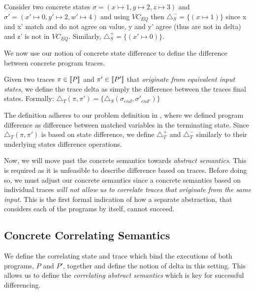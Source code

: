 \begin{Example}
Consider two concrete states $\sigma = (x \mapsto 1,y \mapsto 2,z \mapsto 3)$ and $\sigma' = (x' \mapsto 0,y' \mapsto 2,w' \mapsto 4)$ and using $VC_{EQ}$ then $\triangle_{S}^{-} = \{ (x \mapsto 1) \}$ since x and x' match and do not agree on value, y and y' agree (thus are not in delta) and z' is not in $VC_{EQ}$. Similarly, $\triangle_{S}^{+} = \{ (x' \mapsto 0) \}$.
\end{Example}

We now use our notion of concrete state difference to define the difference between concrete program traces.

\begin{definition}
Given two traces $\pi \in \lbrack\!\lbrack P \rbrack\!\rbrack$ and $\pi' \in \lbrack\!\lbrack P' \rbrack\!\rbrack$ that \emph{originate from equivalent input states}, we define the trace delta as simply the difference between the traces final states. Formally:
$
\triangle_{T}(\pi,\pi') = \{ \triangle_{S}(\sigma_{end},\sigma'_{end'}) \}
$
\end{definition}

The definition adheres to our problem definition in , where we defined program difference as difference between matched variables in the terminating state. Since $\triangle_{T}(\pi,\pi')$ is based on state difference, we define $\triangle_{T}^{+}$ and $\triangle_{T}^{-}$ similarly to their underlying states difference operations.

Now, we will move past the concrete semantics towards \emph{abstract semantics}. This is required as it is unfeasible to describe difference based on traces. Before doing so, we must adjust our concrete semantics since a concrete semantics based on individual traces \emph{will not allow us to correlate traces that originate from the same input}. This is the first formal indication of how a separate abstraction, that considers each of the programs by itself, cannot succeed.

\subsection{Concrete Correlating Semantics} 

We define the correlating state and trace which bind the executions of both programs, $P$ and $P'$, together and define the notion of delta in this setting. This allows us to define the \emph{correlating abstract semantics} which is key for successful differencing.

